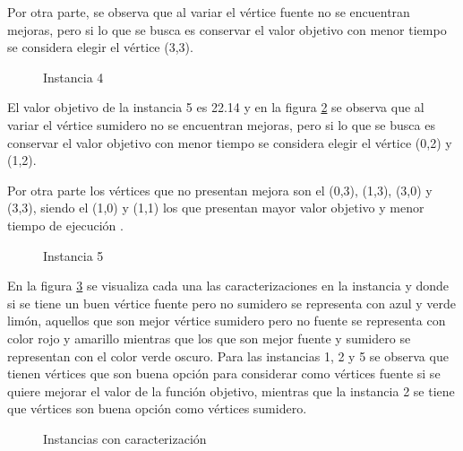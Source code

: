 \documentclass{article}
\begin{document}
Por otra parte, se observa que al variar el vértice fuente no se encuentran mejoras, pero si lo que se busca es conservar el valor objetivo con menor tiempo se considera elegir el vértice (3,3).

\begin{figure}[H]
\centering
{}
\vspace{5mm}
\caption{Instancia 4} \label{Grafos9}
\end{figure}
El valor objetivo de la instancia 5 es 22.14 y en la figura \ref{Grafos10} se observa que al variar el vértice sumidero no se encuentran mejoras, pero si lo que se busca es conservar el valor objetivo con menor tiempo se considera elegir el vértice (0,2) y (1,2).

Por otra parte los vértices que no presentan mejora son el (0,3), (1,3), (3,0) y (3,3), siendo el (1,0) y (1,1) los que presentan mayor valor objetivo y menor tiempo de ejecución . 
\begin{figure}[H]
\centering
{}
\vspace{5mm}
\caption{Instancia 5} \label{Grafos10}
\end{figure}

En la figura \ref{12} se visualiza cada una las caracterizaciones en la instancia y donde si se tiene un buen vértice fuente pero no sumidero se representa con azul y  verde limón, aquellos que son mejor vértice sumidero pero no fuente se representa con color rojo y amarillo mientras que los que son mejor fuente y sumidero se representan con el color verde oscuro. Para las instancias 1, 2 y 5 se observa que tienen vértices que son buena opción para considerar como vértices fuente si se quiere mejorar el valor de la función objetivo, mientras que la instancia 2 se tiene que vértices son buena opción como vértices sumidero. 
\begin{figure}[H]
\centering
{}\hspace{5mm}
\vspace{5mm}
\hspace{5mm}
\vspace{5mm}
\caption{Instancias con caracterización} \label{12}
\end{figure}
\end{document}
